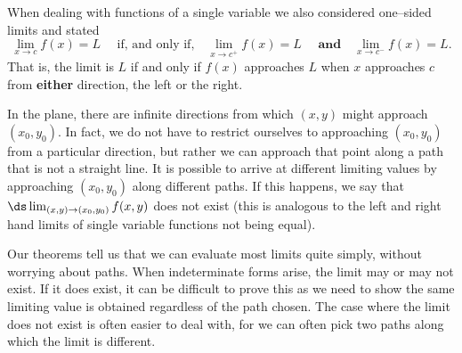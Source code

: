 When dealing with functions of a single variable we also considered one--sided limits and stated
$$\lim_{x\to c}f(x) = L \quad\text{ if, and only if,}\quad \lim_{x\to c^+}f(x) =L \quad\textbf{ and}\quad \lim_{x\to c^-}f(x) =L.$$
That is, the limit is $L$ if and only if $f(x)$ approaches $L$ when $x$ approaches $c$ from \textbf{either} direction, the left or the right.

In the plane, there are infinite directions from which $(x,y)$ might approach $(x_0,y_0)$. In fact, we do not have to restrict ourselves to approaching $(x_0,y_0)$ from a particular direction, but rather we can approach that point along a path that is not a straight line. It is possible to arrive at different limiting values by approaching $(x_0,y_0)$ along different paths. If this happens, we say that $\ds \lim_{(x,y)\to(x_0,y_0) } f(x,y)$ does not exist (this is analogous to the left and right hand limits of single variable functions not being equal).

Our theorems tell us that we can evaluate most limits quite simply, without worrying about  paths. When indeterminate forms arise, the limit may or may not exist. If it does exist, it can be difficult to prove this as we need to show the same limiting value is obtained regardless of the path chosen. The case where the limit does not exist is often easier to deal with, for we can often pick two paths along which the limit is different.



